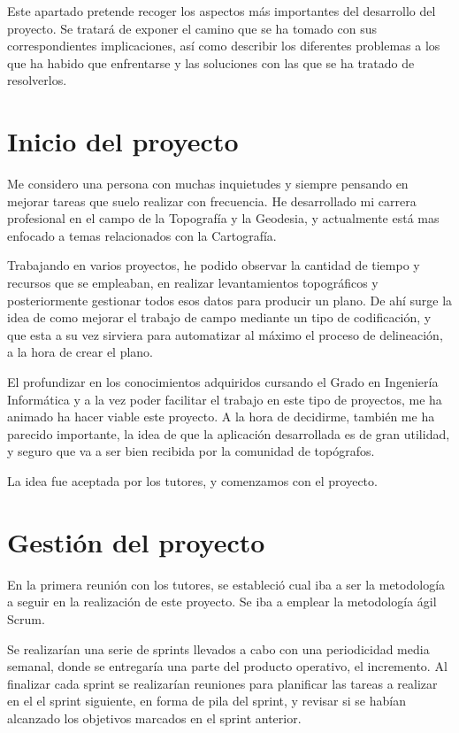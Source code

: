 
Este apartado pretende recoger los aspectos más importantes del desarrollo del proyecto. Se tratará de exponer el camino que se ha tomado con sus correspondientes implicaciones, así como describir los diferentes problemas a
los que ha habido que enfrentarse y las soluciones con las que se ha tratado de resolverlos.

\section{Inicio del proyecto}

Me considero una persona con muchas inquietudes y siempre pensando en mejorar tareas que suelo realizar con frecuencia. He desarrollado mi carrera profesional en el campo de la Topografía y la Geodesia, y actualmente está mas enfocado a temas relacionados con la Cartografía.

Trabajando en varios proyectos, he podido observar la cantidad de tiempo y recursos que se empleaban, en realizar levantamientos topográficos y posteriormente gestionar todos esos datos para producir un plano. De ahí surge la idea de como mejorar el trabajo de campo mediante un tipo de codificación,  y que esta a su vez sirviera para automatizar al máximo el proceso de delineación, a la hora de  crear el plano.

El profundizar en los conocimientos adquiridos cursando el Grado en Ingeniería Informática y a la vez poder facilitar el trabajo en este tipo de proyectos, me ha animado ha hacer viable este proyecto. A la hora de decidirme, también me ha parecido importante, la idea de que la aplicación desarrollada es de gran utilidad, y seguro que va a ser bien recibida por la comunidad de topógrafos.

La idea fue aceptada por los tutores, y comenzamos con el proyecto.


\section{Gestión del proyecto}

En la primera reunión con los tutores, se estableció cual iba a ser la metodología a seguir en la realización de este proyecto. Se iba a emplear la metodología ágil Scrum.

Se realizarían una serie de sprints llevados a cabo con una periodicidad media semanal, donde se entregaría una parte del producto operativo, el incremento. Al finalizar cada sprint se realizarían reuniones para planificar las tareas a realizar en el el sprint siguiente, en forma de pila del sprint, y revisar si se habían alcanzado los objetivos marcados en el sprint anterior.

